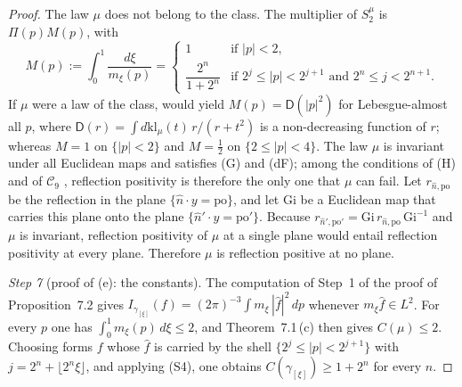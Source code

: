 \documentclass[11pt]{amsart}
\theoremstyle{definition}
\begin{document}
\begin{proof}
The law $\mu$ does not belong to the class.
The multiplier of $S_2^\mu$ is $\Pi(p)M(p)$, with
\begin{equation*}
M(p):=\int_0^1\frac{d\xi}{m_\xi(p)}=
\begin{cases}
1&\text{if }|p|<2,\\
\dfrac{2^n}{1+2^n}&\text{if }2^j\le|p|<2^{j+1}\text{ and }2^n\le j<2^{n+1}.
\end{cases}
\end{equation*}
If $\mu$ were a law of the class, \cite[Theorem~1.4, Part~I\,(d), (f)]{QEDII} would yield $M(p)=\mathsf D(|p|^2)$ for Lebesgue-almost all $p$, where $\mathsf D(r)=\int d\mathrm{kl}_\mu(t)\,r/(r+t^2)$ is a non-decreasing function of $r$;
whereas $M=1$ on $\{|p|<2\}$ and $M=\frac12$ on $\{2\le|p|<4\}$.
The law $\mu$ is invariant under all Euclidean maps and satisfies (G) and (dF);
among the conditions of (H) and of $\mathcal C_9$ \cite[(n3)]{QEDIII}, reflection positivity is therefore the only one that $\mu$ can fail.
Let $r_{\hat n,\mathrm{po}}$ be the reflection in the plane $\{\hat n\cdot y=\mathrm{po}\}$,
and let $\mathrm{Gi}$ be a Euclidean map that carries this plane onto the plane $\{\hat n'\cdot y=\mathrm{po}'\}$.
Because $r_{\hat n',\mathrm{po}'}=\allowbreak \mathrm{Gi}\,\allowbreak r_{\hat n,\mathrm{po}}\,\allowbreak \mathrm{Gi}^{-1}$ and $\mu$ is invariant, reflection positivity of $\mu$ at a single plane would entail reflection positivity at every plane.
Therefore $\mu$ is reflection positive at no plane.

\emph{Step 7} (proof of (e): the constants).
The computation of Step~1 of the proof of Proposition~7.2 gives $I_{\gamma_{[\xi]}}(f)=(2\pi)^{-3}\int m_\xi\,|\hat f|^2\,dp$ whenever $m_\xi\hat f\in L^2$.
For every $p$ one has $\int_0^1m_\xi(p)\,d\xi\le2$,
and Theorem~7.1\,(c) then gives $C(\mu)\le2$.
Choosing forms $f$ whose $\hat f$ is carried by the shell $\{2^j\le|p|<2^{j+1}\}$ with $j=2^n+\lfloor2^n\xi\rfloor$, and applying (S4), one obtains $C(\gamma_{[\xi]})\ge1+2^n$ for every $n$.
\end{proof}
\end{document}
